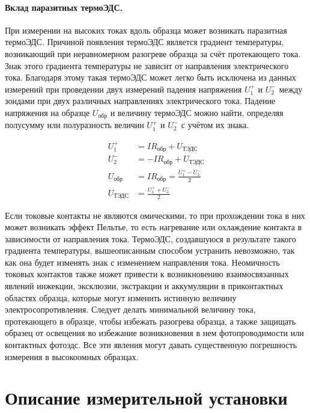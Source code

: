 \paragraph{Вклад паразитных термоЭДС.}

При измерении на высоких токах вдоль образца может возникать паразитная термоЭДС. Причиной появления термоЭДС является градиент температуры, возникающий при неравномерном разогреве образца за счёт протекающего тока. Знак этого градиента температуры не зависит от направления электрического тока. Благодаря этому такая термоЭДС может легко быть исключена из данных измерений при проведении двух измерений падения напряжения $U_{1}^{+}$ и $U_{2}^{-}$ между зондами при двух различных направлениях электрического тока. Падение напряжения на образце $U_{\text{обр}}$ и величину термоЭДС можно найти, определяя полусумму или полуразность величин $U_{1}^{+}$ и $U_{2}^{-}$ с учётом их знака.

\begin{equation}
\begin{split}
U_{1}^{+} &= I R_{\text{обр}} + U_{\text{ТЭДС}} \\
U_{2}^{-} &= -I R_{\text{обр}} + U_{\text{ТЭДС}} \\
U_{\text{обр}} &= I R_{\text{обр}} = \frac{U_{1}^{+} - U_{2}^{-}}{2} \\
U_{\text{ТЭДС}} &= \frac{U_{1}^{+} + U_{2}^{-}}{2}
\end{split}
\label{Uteds}
\end{equation}

Если токовые контакты не являются омическими, то при прохождении тока в них может возникать эффект Пельтье, то есть нагревание или охлаждение контакта в зависимости от направления тока. ТермоЭДС, создавшуюся в результате такого градиента температуры, вышеописанным способом устранить невозможно, так как она будет изменять знак с изменением направления тока. Неомичность токовых контактов также может привести к возникновению взаимосвязанных явлений инжекции, эксклюзии, экстракции и аккумуляции в приконтактных областях образца, которые могут изменить истинную величину электросопротивления. Следует делать минимальной величину тока, протекающего в образце, чтобы избежать разогрева образца, а также защищать образец от освещения во избежание возникновения в нем фотопроводимости или контактных фотоэдс. Все эти явления могут давать существенную погрешность измерения в высокоомных образцах.

\section{Описание измерительной установки}

